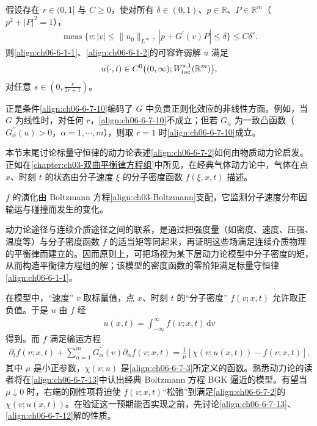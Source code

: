 \documentclass[../../main.tex]{subfiles}
\begin{document}
\begin{theorem}\label{theorem:ch06-6-7-2}
假设存在 $r\in(0,1]$ 与 $C\geqslant 0$，使对所有 $\delta\in(0,1)$、$p\in\mathbb{R}$、$P\in\mathbb{R}^{m}$（$p^{2}+|P|^{2}=1$），
\begin{align}
\operatorname{meas}\{v:|v|\leqslant\|u_{0}\|_{L^{\infty}},\ |p+G^{\prime}(v)P|\leqslant\delta\}\leqslant C\delta^{r}.
\label{align:ch06-6-7-10}
\end{align}
则\eqref{align:ch06-6-1-1}、\eqref{align:ch06-6-1-2}的可容许弱解 $u$ 满足
\begin{align}
u(\cdot,t)\in C^{0}\bigl{(}(0,\infty);W_{loc}^{s,1}(\mathbb{R}^{m})\bigr{)},
\label{align:ch06-6-7-11}
\end{align}
对任意 $s\in(0,\frac{r}{2r+1})$。
\end{theorem}

正是条件\eqref{align:ch06-6-7-10}编码了 $G$ 中负责正则化效应的非线性方面。例如，当 $G$ 为线性时，对任何 $r$，\eqref{align:ch06-6-7-10}不成立；但若 $G_{\alpha}$ 为一致凸函数（$G_{\alpha}^{\prime\prime}(u)>0$，$\alpha=1,\cdots,m$），则取 $r=1$ 时\eqref{align:ch06-6-7-10}成立。

本节末尾讨论标量守恒律的动力论表述\eqref{align:ch06-6-7-2}如何由物质动力论启发。正如在\cref{chapter:ch03-双曲平衡律方程组}中所见，在经典气体动力论中，气体在点 $x$、时刻 $t$ 的状态由分子速度 $\xi$ 的分子密度函数 $f(\xi,x,t)$ 描述。

$f$ 的演化由 Boltzmann 方程\eqref{align:ch03-Boltzmann}支配，它监测分子速度分布因输运与碰撞而发生的变化。

动力论途径与连续介质途径之间的联系，是通过把强度量（如密度、速度、压强、温度等）与分子密度函数 $f$ 的适当矩等同起来，再证明这些场满足连续介质物理的平衡律而建立的。因而原则上，可把场视为某下层动力论模型中分子密度的矩，从而构造平衡律方程组的解；该模型的密度函数的零阶矩满足标量守恒律\eqref{align:ch06-6-1-1}。

在模型中，“速度” $v$ 取标量值，点 $x$、时刻 $t$ 的“分子密度” $f(v;x,t)$ 允许取正负值。于是 $u$ 由 $f$ 经
\begin{align}
u(x,t)=\int_{-\infty}^{\infty}f(v;x,t)\,\mathrm{d}v
\label{align:ch06-6-7-12}
\end{align}
得到。而 $f$ 满足输运方程
\begin{align}
\partial_{t}f(v;x,t)+\sum_{\alpha=1}^{m}G_{\alpha}^{\prime}(v)\partial_{\alpha}f(v;x,t)=\frac{1}{\mu}[\chi(v;u(x,t))-f(v;x,t)],
\label{align:ch06-6-7-13}
\end{align}
其中 $\mu$ 是小正参数，$\chi(v;u)$ 是\eqref{align:ch06-6-7-3}所定义的函数。熟悉动力论的读者将在\eqref{align:ch06-6-7-13}中认出经典 Boltzmann 方程 BGK 逼近的模型。有望当 $\mu\downarrow 0$ 时，右端的刚性项将迫使 $f(v;x,t)$“松弛”到满足\eqref{align:ch06-6-7-2}的 $\chi(v;u(x,t))$。在验证这一预期能否实现之前，先讨论\eqref{align:ch06-6-7-13}、\eqref{align:ch06-6-7-12}解的性质。
\end{document}

